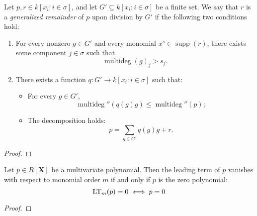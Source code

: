         \begin{lemma}\label{IsRemainder_def’’}
          \leanok
          Let \( p, r \in k[x_i : i \in \sigma] \), and let \( G' \subseteq k[x_i : i \in \sigma] \) be a finite set.
We say that \( r \) is a \emph{generalized remainder} of \( p \) upon division by \( G' \) if the following two conditions hold:

\begin{enumerate}
  \item For every nonzero \( g \in G' \) and every monomial \( x^s \in \operatorname{supp}(r) \),
        there exists some component \( j \in \sigma \) such that
        \[
        \operatorname{multideg}(g)_j > s_j.
        \]
  \item There exists a function \( q : G' \to k[x_i : i \in \sigma] \) such that:
  \begin{itemize}
    \item For every \( g \in G' \),
          \[
          \operatorname{multideg}''(q(g)g) \leq \operatorname{multideg}''(p);
          \]
    \item The decomposition holds:
          \[
          p = \sum_{g \in G'} q(g)g + r.
          \]
  \end{itemize}
\end{enumerate}

        \end{lemma}
        
        \begin{proof}
          \leanok
        \end{proof}
        

        \begin{lemma}\label{lm_eq_zero_iff}
          \leanok
          Let $p \in R[\mathbf{X}]$ be a multivariate polynomial. Then the leading term of $p$
vanishes with respect to monomial order $m$ if and only if $p$ is the zero polynomial:
\[
  \operatorname{LT}_m(p) = 0 \iff p = 0
\]

        \end{lemma}
        
        \begin{proof}
          
          \leanok
        \end{proof}
        

